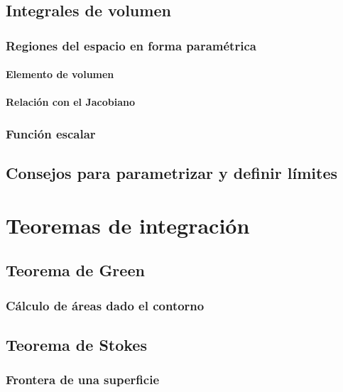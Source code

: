\documentclass[12pt, fleqn]{report}                             %
\theoremstyle{break}                                            %
\begin{document}
        \section{Integrales de volumen}
        
            \subsection{Regiones del espacio en forma paramétrica}
            
                \subsubsection{Elemento de volumen}
                
                \subsubsection{Relación con el Jacobiano}
        
            \subsection{Función escalar}
            
        \section{Consejos para parametrizar y definir límites}
    
    \chapter{Teoremas de integración}
    
        \section{Teorema de Green}
        
            \subsection{Cálculo de áreas dado el contorno}
        
        \section{Teorema de Stokes}
        
            \subsection{Frontera de una superficie}
        
\end{document}
